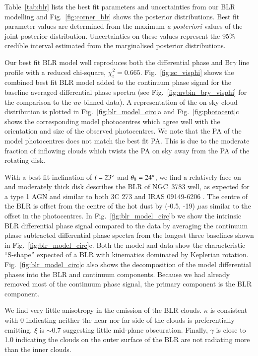 \documentclass[longauth,]{aa}
\newcommand{\brg}{Br$\gamma$}
\newcommand{\uas}{{\mbox{$\mu$as}}}
\begin{document}


Table~\ref{tab:blr} lists the best fit parameters and uncertainties from our BLR modelling and Fig.~\ref{fig:corner_blr} shows the posterior distributions. Best fit parameter values are determined from the maximum \textit{a posteriori} values of the joint posterior distribution. Uncertainties on these values represent the 95\% credible interval estimated from the marginalised posterior distributions. 

Our best fit BLR model well reproduces both the differential phase and \brg{} line profile with a reduced chi-square, $\chi^2_{\mathrm{r}} = 0.665$. 
Fig.~\ref{fig:sc_visphi} shows the combined best fit BLR model added to the continuum phase signal for the baseline averaged differential phase spectra (see Fig.~\ref{fig:uvbin_bry_visphi} for the comparison to the $uv$-binned data). A representation of the on-sky cloud distribution is plotted in Fig.~\ref{fig:blr_model_circ}a and Fig.~\ref{fig:photocent}c shows the corresponding model photocentres which agree well with the orientation and size of the observed photocentres. We note that the PA of the model photocentres does not match the best fit PA. This is due to the moderate fraction of inflowing clouds which twists the PA on sky away from the PA of the rotating disk.

With a best fit inclination of $i = 23 \degree$ and $\theta_0 = 24 \degree$, we find a relatively face-on and moderately thick disk describes the BLR of NGC~3783 well, as expected for a type 1 AGN and similar to both 3C 273 \citep{GC2018Natur} and IRAS 09149-6206 . The centre of the BLR is offset from the centre of the hot dust by (-0.5, -19) \uas{} similar to the offset in the photocentres. In Fig.~\ref{fig:blr_model_circ}b we show the intrinsic BLR differential phase signal compared to the data by averaging the continuum phase subtracted differential phase spectra from the longest three baselines shown in Fig.~\ref{fig:blr_model_circ}c. Both the model and data show the characteristic ``S-shape'' expected of a BLR with kinematics dominated by Keplerian rotation. Fig.~\ref{fig:blr_model_circ}c also shows the decomposition of the model differential phases into the BLR and continuum components. Because we had already removed most of the continuum phase signal, the primary component is the BLR component. 

We find very little anisotropy in the emission of the BLR clouds. $\kappa$ is consistent with 0 indicating neither the near nor far side of the clouds is preferentially emitting. $\xi$ is $\sim0.7$ suggesting little mid-plane obscuration. Finally, $\gamma$ is close to 1.0 indicating the clouds on the outer surface of the BLR are not radiating more than the inner clouds. 
\end{document}
